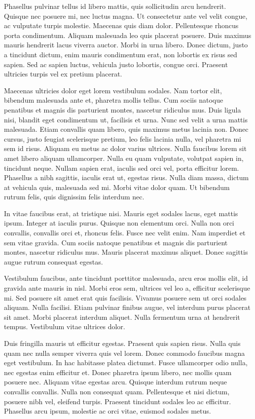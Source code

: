 Phasellus pulvinar tellus id libero mattis, quis sollicitudin arcu hendrerit. Quisque nec posuere mi, nec luctus magna. Ut consectetur ante vel velit congue, ac vulputate turpis molestie. Maecenas quis diam dolor. Pellentesque rhoncus porta condimentum. Aliquam malesuada leo quis placerat posuere. Duis maximus mauris hendrerit lacus viverra auctor. Morbi in urna libero. Donec dictum, justo a tincidunt dictum, enim mauris condimentum erat, non lobortis ex risus sed sapien. Sed ac sapien luctus, vehicula justo lobortis, congue orci. Praesent ultricies turpis vel ex pretium placerat.

Maecenas ultricies dolor eget lorem vestibulum sodales. Nam tortor elit, bibendum malesuada ante et, pharetra mollis tellus. Cum sociis natoque penatibus et magnis dis parturient montes, nascetur ridiculus mus. Duis ligula nisi, blandit eget condimentum ut, facilisis et urna. Nunc sed velit a urna mattis malesuada. Etiam convallis quam libero, quis maximus metus lacinia non. Donec cursus, justo feugiat scelerisque pretium, leo felis lacinia nulla, vel pharetra mi sem id risus. Aliquam eu metus ac dolor varius ultrices. Nulla faucibus lorem sit amet libero aliquam ullamcorper. Nulla eu quam vulputate, volutpat sapien in, tincidunt neque. Nullam sapien erat, iaculis sed orci vel, porta efficitur lorem. Phasellus a nibh sagittis, iaculis erat ut, egestas risus. Nulla diam massa, dictum at vehicula quis, malesuada sed mi. Morbi vitae dolor quam. Ut bibendum rutrum felis, quis dignissim felis interdum nec.

In vitae faucibus erat, at tristique nisi. Mauris eget sodales lacus, eget mattis ipsum. Integer at iaculis purus. Quisque non elementum orci. Nulla non orci convallis, convallis orci et, rhoncus felis. Fusce nec velit enim. Nam imperdiet et sem vitae gravida. Cum sociis natoque penatibus et magnis dis parturient montes, nascetur ridiculus mus. Mauris placerat maximus aliquet. Donec sagittis augue rutrum consequat egestas.

Vestibulum faucibus, ante tincidunt porttitor malesuada, arcu eros mollis elit, id gravida ante mauris in nisl. Morbi eros sem, ultrices vel leo a, efficitur scelerisque mi. Sed posuere sit amet erat quis facilisis. Vivamus posuere sem ut orci sodales aliquam. Nulla facilisi. Etiam pulvinar finibus augue, vel interdum purus placerat sit amet. Morbi placerat interdum aliquet. Nulla fermentum urna at hendrerit tempus. Vestibulum vitae ultrices dolor.

Duis fringilla mauris ut efficitur egestas. Praesent quis sapien risus. Nulla quis quam nec nulla semper viverra quis vel lorem. Donec commodo faucibus magna eget vestibulum. In hac habitasse platea dictumst. Fusce ullamcorper odio nulla, nec egestas enim efficitur et. Donec pharetra ipsum libero, nec mollis quam posuere nec. Aliquam vitae egestas arcu. Quisque interdum rutrum neque convallis convallis. Nulla non consequat quam. Pellentesque et nisi dictum, posuere nibh vel, eleifend turpis. Praesent tincidunt sodales leo ac efficitur. Phasellus arcu ipsum, molestie ac orci vitae, euismod sodales metus.


